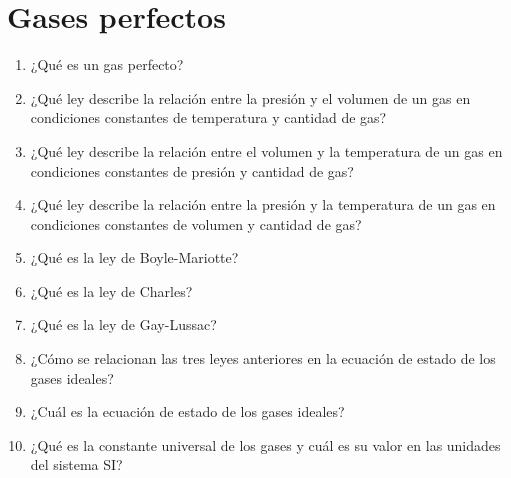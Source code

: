 \documentclass[../main]{subfiles}
\begin{document}
\chapter{Gases perfectos}
\begin{enumerate}
  \item ¿Qué es un gas perfecto?
  \item ¿Qué ley describe la relación entre la presión y el volumen
    de un gas en condiciones constantes de temperatura y cantidad de gas?
  \item ¿Qué ley describe la relación entre el volumen y la
    temperatura de un gas en condiciones constantes de presión y
    cantidad de gas?
  \item ¿Qué ley describe la relación entre la presión y la
    temperatura de un gas en condiciones constantes de volumen y
    cantidad de gas?
  \item ¿Qué es la ley de Boyle-Mariotte?
  \item ¿Qué es la ley de Charles?
  \item ¿Qué es la ley de Gay-Lussac?
  \item ¿Cómo se relacionan las tres leyes anteriores en la ecuación
    de estado de los gases ideales?
  \item ¿Cuál es la ecuación de estado de los gases ideales?
  \item ¿Qué es la constante universal de los gases y cuál es su
    valor en las unidades del sistema SI?
\end{enumerate}
\end{document}
